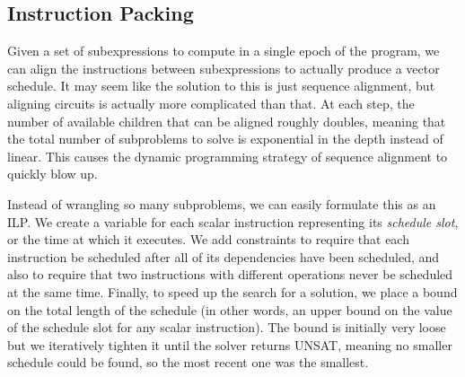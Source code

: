 \subsection{Instruction Packing}
Given a set of subexpressions to compute in a single epoch of the program, we can align the instructions between subexpressions to actually produce a vector schedule.
It may seem like the solution to this is just sequence alignment, but aligning circuits is actually more complicated than that.
At each step, the number of available children that can be aligned roughly doubles, meaning that the total number of subproblems to solve is exponential in the depth instead of linear. 
This causes the dynamic programming strategy of sequence alignment to quickly blow up.

Instead of wrangling so many subproblems, we can easily formulate this as an ILP.
We create a variable for each scalar instruction representing its {\em schedule slot}, or the time at which it executes.
We add constraints to require that each instruction be scheduled after all of its dependencies have been scheduled, and also to require that two instructions with different operations never be scheduled at the same time. 
Finally, to speed up the search for a solution, we place a bound on the total length of the schedule (in other words, an upper bound on the value of the schedule slot for any scalar instruction).
The bound is initially very loose but we iteratively tighten it until the solver returns UNSAT, meaning no smaller schedule could be found, so the most recent one was the smallest. 

